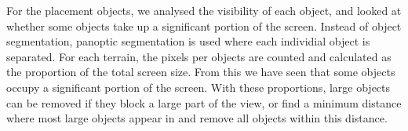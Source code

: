 For the placement objects, we analysed the visibility of each object, and looked at whether some objects take up a significant portion of the screen. Instead of object segmentation, panoptic segmentation is used where each individial object is separated. For each terrain, the pixels per objects are counted and calculated as the proportion of the total screen size. From this we have seen that some objects occupy a significant portion of the screen. With these proportions, large objects can be removed if they block a large part of the view, or find a minimum distance where most large objects appear in and remove all objects within this distance.
